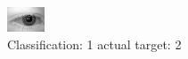 \begin{figure}[h!]
\begin{center}
\includegraphics[width=0.60\columnwidth]{figures/ID473_class_1_target_2.png}
\end{center}
\caption{ Classification: 1 actual target: 2}
\label{fig:ID473_class_1_target_2}
\end{figure}
